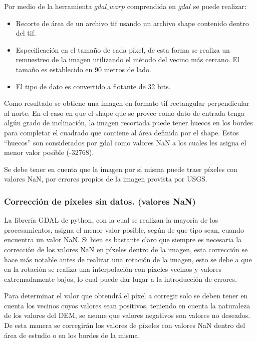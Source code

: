 \documentclass[10pt,a4paper, twoside]{report}
\begin{document}
Por medio de la herramienta $gdal\_warp$ comprendida en $gdal$ se puede realizar:

\begin{itemize}
\item Recorte de área de un archivo tif usando un archivo shape contenido dentro del tif.
\item Especificación en el tamaño de cada píxel, de esta forma se realiza un remuestreo de la imagen utilizando el método del vecino más cercano. El tamaño es establecido en 90 metros de lado.
\item El tipo de dato es convertido a flotante de 32 bits.
\end{itemize}

Como resultado se obtiene una imagen en formato tif rectangular perpendicular al norte. En el caso en que el shape que se provee como dato de entrada tenga algún grado de inclinación, la imagen recortada puede tener huecos en los bordes para completar el cuadrado que contiene al área definida por el shape. Estos "`huecos"' son considerados por gdal como valores NaN a los cuales les asigna el menor valor posible (-32768).

Se debe tener en cuenta que la imagen por si misma puede traer píxeles con valores NaN, por errores propios de la imagen provista por USGS.

\subsubsection{Corrección de píxeles sin datos. (valores NaN)}

La librería GDAL de python, con la cual se realizan la mayoría de los procesamientos, asigna el menor valor posible, según de que tipo sean, cuando encuentra un valor NaN.
Si bien es bastante claro que siempre es necesaria la corrección de los valores NaN en píxeles dentro de la imagen, esta corrección se hace más notable antes de realizar una rotación de la imagen, esto se debe a que en la rotación se realiza una interpolación con píxeles vecinos y valores extremadamente bajos, lo cual puede dar lugar a la introducción de errores.

Para determinar el valor que obtendrá el píxel a corregir solo se deben tener en cuenta los vecinos cuyos valores sean positivos, teniendo en cuenta la naturaleza de los valores del DEM, se asume que valores negativos son valores no deseados. De esta manera se corregirán los valores de píxeles con valores NaN dentro del área de estudio o en los bordes de la misma.
\end{document}
